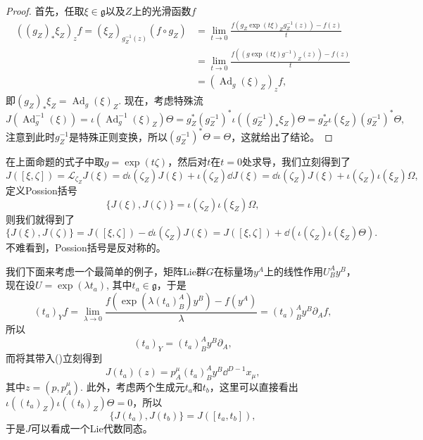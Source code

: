 \begin{proof}
首先，任取$\xi\in \mathfrak g$以及$Z$上的光滑函数$f$
\begin{align*}
((g_Z)_*\xi_Z)_{z} f=(\xi_Z)_{g_Z^{-1}(z)} (f\circ g_Z)&=\lim_{t\to 0}\frac{f(g_Z\exp(t\xi)_Zg_Z^{-1}(z))-f(z)}{t}\\
&=\lim_{t\to 0}\frac{f((g\exp(t\xi)g^{-1})_Z(z))-f(z)}{t}\\
&=(\operatorname{Ad}_g(\xi)_Z)_zf,
\end{align*}
即$(g_Z)_*\xi_Z=\operatorname{Ad}_g(\xi)_Z$. 现在，考虑特殊流
\[
	J(\operatorname{Ad}^{-1}_g(\xi))=\iota(\operatorname{Ad}_g^{-1}(\xi)_Z)\Theta
	=g_Z^*(g^{-1}_Z)^*\iota\left((g^{-1}_Z)_*\xi_Z\right)\Theta=g_Z^*\iota(\xi_Z)(g^{-1}_Z)^*\Theta,
\]
注意到此时$g^{-1}_Z$是特殊正则变换，所以$(g^{-1}_Z)^*\Theta=\Theta$，这就给出了结论。
\end{proof}

在上面命题的式子中取$g=\exp(t\zeta)$，然后对$t$在$t=0$处求导，我们立刻得到了
\[
	J([\xi,\zeta])=\mathscr L_{\zeta_Z}J(\xi)=\dd \iota(\zeta_Z)J(\xi)+\iota(\zeta_Z)\dd J(\xi)=\dd \iota(\zeta_Z)J(\xi)+\iota(\zeta_Z)\iota(\xi_Z) \Omega,
\]
定义Possion括号
\[
	\{J(\xi),J(\zeta)\}=\iota(\zeta_Z)\iota(\xi_Z) \Omega,
\]
则我们就得到了
\[
	\{J(\xi),J(\zeta)\}=J([\xi,\zeta])-\dd \iota({\zeta_Z})J(\xi)=J([\xi,\zeta])+\dd \left(\iota({\zeta_Z})\iota({\xi_Z})\Theta\right).
\]
不难看到，Possion括号是反对称的。

\begin{para}
我们下面来考虑一个最简单的例子，矩阵Lie群$G$在标量场$y^A$上的线性作用$U^A_By^B$，现在设$U=\exp(\lambda t_a)$,
其中$t_a\in \mathfrak{g}$，于是
\[
	(t_a)_Yf=\lim_{\lambda \to 0}\frac{f(\exp(\lambda (t_a)^A_B)y^B)-f(y^A)}{\lambda}=(t_a)^A_By^B\partial_Af,
\]
所以
\[
	(t_a)_Y=(t_a)^A_By^B\partial_A,
\]
而将其带入(\theequation)立刻得到
\[
	J(t_a)(z)=p_A^\mu (t_a)^A_By^B\dd^{D-1}x_\mu,
\]
其中$z=(p,p_A^\mu)$. 此外，考虑两个生成元$t_a$和$t_b$，这里可以直接看出$\iota({(t_a)}_Z)\iota({(t_b)}_Z)\Theta=0$，所以
\[
	\{J(t_a),J(t_b)\}=J([t_a,t_b]),
\]
于是$J$可以看成一个Lie代数同态。
\end{para}



